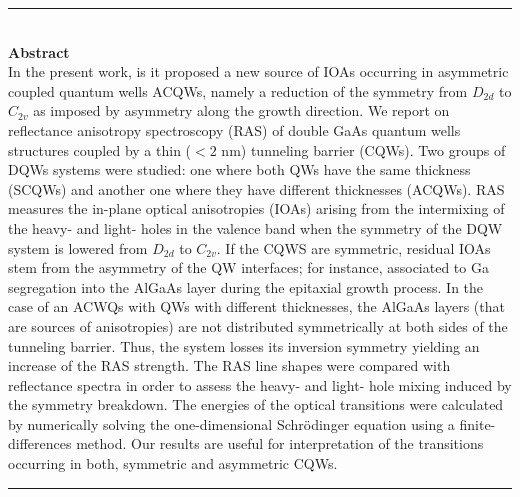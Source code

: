 \cleardoublepage
\vspace{-5cm}
\begin{vcentrepage}
	\noindent\rule[2pt]{\textwidth}{0.8pt}\\

	{\Large\textbf{Abstract}}\\

	
	In the present work, is it proposed a new source of IOAs occurring in asymmetric coupled quantum wells ACQWs, namely a reduction of the symmetry from $D_{2d}$ to $C_{2v}$ as imposed by asymmetry along the growth direction.
	We report  on reflectance anisotropy spectroscopy (RAS) of  double GaAs quantum wells structures coupled by a thin ($<2$ nm) tunneling  barrier (CQWs). Two groups of DQWs systems were studied: one where both QWs have the same thickness (SCQWs) and another one where they have different thicknesses (ACQWs). RAS measures the in-plane optical anisotropies (IOAs) arising from the intermixing of the heavy- and light- holes in the valence band when the symmetry of the DQW system is lowered from $D_{2d}$ to $C_{2v}$. If the CQWS are symmetric, residual IOAs stem from the asymmetry of the QW  interfaces; for instance, associated to Ga segregation into the AlGaAs layer during the epitaxial growth process. In the case of an ACWQs with QWs with different thicknesses, the AlGaAs layers (that are sources of anisotropies) are not distributed symmetrically at both sides of the tunneling barrier. Thus, the system losses its inversion symmetry  yielding an increase of the RAS strength. The RAS line shapes were compared with reflectance spectra in order to assess the heavy- and light- hole mixing induced by the  symmetry breakdown. The energies of the optical transitions were calculated by numerically solving the one-dimensional Schr\"odinger equation using a finite-differences method. Our results are useful for interpretation of the transitions occurring in both, symmetric and asymmetric CQWs.
	
	\noindent\rule[2pt]{\textwidth}{0.8pt}
\end{vcentrepage}


%